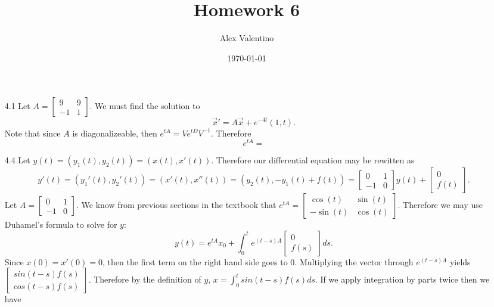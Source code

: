 \documentclass[12pt, letterpaper]{article}
\date{\today}
\author{Alex Valentino}
\title{Homework 6}
\begin{document}
	\begin{enumerate}
		\item[4.1]
		Let $A = \begin{bmatrix}	9 & 9\\ -1 & 1\end{bmatrix} $.  We must find the solution to $$ \Vec{x}'  = A \Vec{x} + e^{-4t} (1,t). $$
		Note that since $A$ is diagonalizeable, then $e^{tA} = V e^{tD} V^{-1}$.  Therefore 
		$$
			e^{tA} = 
		$$
		\item[4.4]
		Let $y(t) = (y_1(t),y_2(t)) = (x(t),x'(t))$.  Therefore our differential equation may be rewitten as 
		$$
			y'(t) = (y_1'(t),y_2'(t)) = (x'(t),x''(t)) = (y_2(t), -y_1(t) + f(t)) = \begin{bmatrix}
			0 & 1 \\ -1 & 0 \end{bmatrix} y(t) + \begin{bmatrix}
			0 \\ f(t)
\end{bmatrix}.								
		$$
		Let $A =\begin{bmatrix}
			0 & 1 \\ -1 & 0 \end{bmatrix}$.   
		We know from previous sections in the textbook that $e^{tA} = \begin{bmatrix}
		\cos(t) & \sin(t) \\ -\sin(t) & \cos(t)
\end{bmatrix}		 $.  Therefore we may use Duhamel's formula to solve for $y$: 
$$
	y(t) = e^{tA}x_0 + \int_0^t e^{(t-s)A} \begin{bmatrix}
	0 \\ f(s)
	\end{bmatrix}ds.
$$
	Since $x(0) = x'(0) = 0$, then the first term on the right hand side goes to 0.  Multiplying the vector through $e^{(t-s)A}$ yields $\begin{bmatrix}
	sin(t-s) f(s) \\ cos(t-s) f(s)
\end{bmatrix}	 $.  Therefore by the definition of $y$, $x = \int_0^t sin(t-s) f(s) ds$.  If we apply integration by parts twice then we have $$ 
	\end{enumerate}
\end{document}

